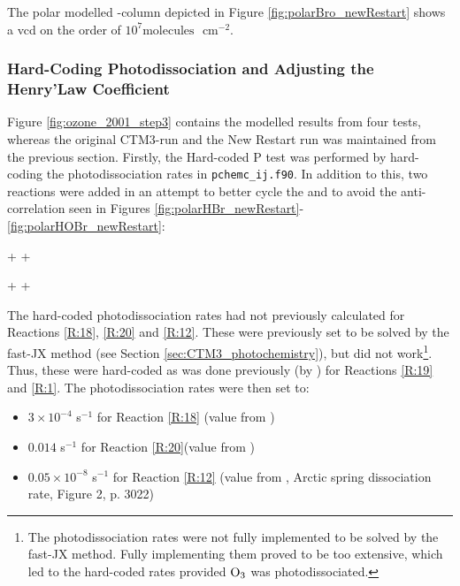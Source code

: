 \medskip

The polar modelled -column depicted in Figure \ref{fig:polarBro_newRestart} shows a \acrshort{vcd} on the order of $10^7 \text{molecules }$ cm$^{-2}$. 

\subsubsection{Hard-Coding Photodissociation and Adjusting the Henry'Law Coefficient}\label{sec:res_step3}

Figure \ref{fig:ozone_2001_step3} contains the modelled results from four tests, whereas the original CTM3-run and the New Restart run was maintained from the previous section. Firstly, the Hard-coded P test was performed by hard-coding the photodissociation rates in \texttt{pchemc\_ij.f90}. In addition to this, two reactions were added in an attempt to better cycle the  and  to avoid the anti-correlation seen in Figures \ref{fig:polarHBr_newRestart}-\ref{fig:polarHOBr_newRestart}:  

\begin{reaction}
     +  \rightarrow {} + 
    \label{rqn:oh_br2}
\end{reaction}


\begin{reaction}
     +  \rightarrow {} + 
    \label{rqn:oh_hbr}
\end{reaction}

The hard-coded photodissociation rates had not previously calculated for Reactions \ref{R:18}, \ref{R:20} and \ref{R:12}. These were previously set to be solved by the fast-JX method (see Section \ref{sec:CTM3_photochemistry}), but did not work\footnote{The photodissociation rates were not fully implemented to be solved by the fast-JX method. Fully implementing them proved to be too extensive, which led to the hard-coded rates provided $\mathrm{O_3}$ was photodissociated.}. Thus, these were hard-coded as was done previously (by \cite{Susanne}) for Reactions \ref{R:19} and \ref{R:1}. The photodissociation rates were then set to: 

\begin{itemize}
    \item $3\times10^{-4}$ s$^{-1}$ for Reaction \ref{R:18} (value from \cite{CAO})
    \item $0.014$ s$^{-1}$ for Reaction \ref{R:20}(value from \cite{CAO})
    \item $0.05\times10^{-8}$ s$^{-1}$ for Reaction \ref{R:12} (value from \cite{Papanastasiou2013}, Arctic spring dissociation rate, Figure 2, p. 3022)
\end{itemize}


